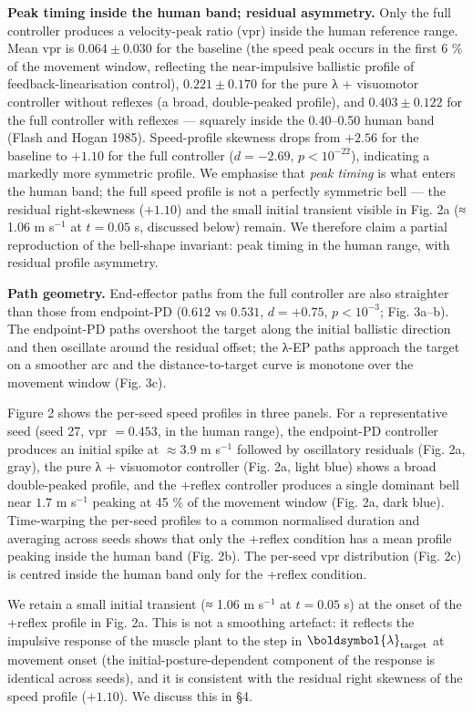 \documentclass[
  11pt,
]{article}
\begin{document}
\textbf{Peak timing inside the human band; residual asymmetry.} Only the
full controller produces a velocity-peak ratio (vpr) inside the human
reference range. Mean vpr is \(0.064 \pm 0.030\) for the baseline (the
speed peak occurs in the first 6 \% of the movement window, reflecting
the near-impulsive ballistic profile of feedback-linearisation control),
\(0.221 \pm 0.170\) for the pure λ + visuomotor controller without
reflexes (a broad, double-peaked profile), and \(0.403 \pm 0.122\) for
the full controller with reflexes --- squarely inside the 0.40--0.50
human band (Flash and Hogan 1985). Speed-profile skewness drops from
\(+2.56\) for the baseline to \(+1.10\) for the full controller
(\(d = -2.69\), \(p < 10^{-22}\)), indicating a markedly more symmetric
profile. We emphasise that \emph{peak timing} is what enters the human
band; the full speed profile is not a perfectly symmetric bell --- the
residual right-skewness (\(+1.10\)) and the small initial transient
visible in Fig. 2a (≈ 1.06 m s\(^{-1}\) at \(t = 0.05\) s, discussed
below) remain. We therefore claim a partial reproduction of the
bell-shape invariant: peak timing in the human range, with residual
profile asymmetry.

\textbf{Path geometry.} End-effector paths from the full controller are
also straighter than those from endpoint-PD (\(0.612\) vs \(0.531\),
\(d = +0.75\), \(p < 10^{-3}\); Fig. 3a--b). The endpoint-PD paths
overshoot the target along the initial ballistic direction and then
oscillate around the residual offset; the λ-EP paths approach the target
on a smoother arc and the distance-to-target curve is monotone over the
movement window (Fig. 3c).

Figure 2 shows the per-seed speed profiles in three panels. For a
representative seed (seed 27, vpr \(= 0.453\), in the human range), the
endpoint-PD controller produces an initial spike at \(\approx 3.9\) m
s\(^{-1}\) followed by oscillatory residuals (Fig. 2a, gray), the pure λ
+ visuomotor controller (Fig. 2a, light blue) shows a broad
double-peaked profile, and the +reflex controller produces a single
dominant bell near \(1.7\) m s\(^{-1}\) peaking at 45 \% of the movement
window (Fig. 2a, dark blue). Time-warping the per-seed profiles to a
common normalised duration and averaging across seeds shows that only
the +reflex condition has a mean profile peaking inside the human band
(Fig. 2b). The per-seed vpr distribution (Fig. 2c) is centred inside the
human band only for the +reflex condition.

We retain a small initial transient (≈ 1.06 m s\(^{-1}\) at \(t = 0.05\)
s) at the onset of the +reflex profile in Fig. 2a. This is not a
smoothing artefact: it reflects the impulsive response of the muscle
plant to the step in \(\boldsymbol{\lambda}_{\rm target}\) at movement
onset (the initial-posture-dependent component of the response is
identical across seeds), and it is consistent with the residual right
skewness of the speed profile (\(+1.10\)). We discuss this in §4.
\end{document}
